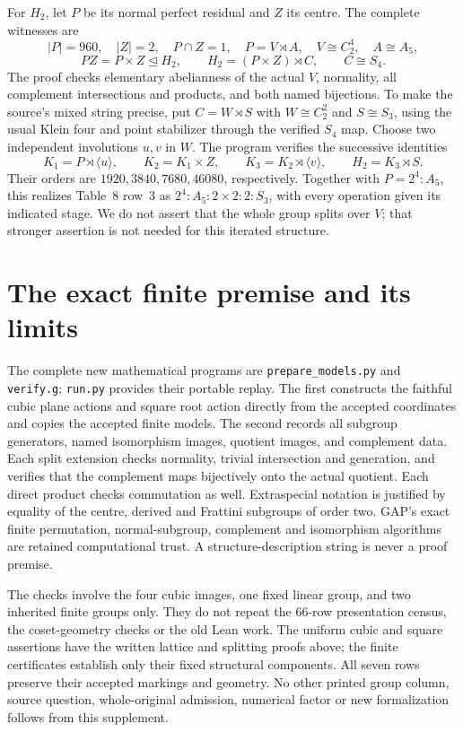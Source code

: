\documentclass[11pt]{article}
\newcommand{\C}{C}\newcommand{\Z}{\mathbb Z}
\begin{document}
For $H_2$, let $P$ be its normal perfect residual and $Z$ its centre.
The complete witnesses are
\[
 |P|=960,\quad |Z|=2,\quad P\cap Z=1,\quad
 P=V\rtimes A,\quad V\cong\C_2^4,\quad A\cong A_5,
\]
\[
 PZ=P\times Z\trianglelefteq H_2,\qquad
 H_2=(P\times Z)\rtimes C,\qquad C\cong S_4.
\]
The proof checks elementary abelianness of the actual $V$, normality,
all complement intersections and products, and both named bijections.
To make the source's mixed string precise, put
$C=W\rtimes S$ with $W\cong\C_2^2$ and $S\cong S_3$, using the usual
Klein four and point stabilizer through the verified $S_4$ map. Choose
two independent involutions $u,v$ in $W$. The program verifies the
successive identities
\[
 K_1=P\rtimes\langle u\rangle,\qquad
 K_2=K_1\times Z,\qquad K_3=K_2\rtimes\langle v\rangle,
 \qquad H_2=K_3\rtimes S.
\]
Their orders are $1920,3840,7680,46080$, respectively. Together with
$P=2^4:A_5$, this realizes Table~8 row~3 as
$2^4:A_5:2\times2:2:S_3$, with every operation given its indicated
stage. We do not assert that the whole group splits over $V$; that
stronger assertion is not needed for this iterated structure.

\section{The exact finite premise and its limits}
The complete new mathematical programs are
\texttt{prepare\_models.py} and \texttt{verify.g}; \texttt{run.py}
provides their portable replay. The first constructs the faithful cubic
plane actions and square root action directly from the accepted
coordinates and copies the accepted finite models. The second records
all subgroup generators, named isomorphism images, quotient images,
and complement data. Each split extension checks normality, trivial
intersection and generation, and verifies that the complement maps
bijectively onto the actual quotient. Each direct product checks
commutation as well. Extraspecial notation is justified by equality of
the centre, derived and Frattini subgroups of order two. GAP's exact
finite permutation, normal-subgroup, complement and isomorphism
algorithms are retained computational trust. A structure-description
string is never a proof premise.

The checks involve the four cubic images, one fixed linear group, and
two inherited finite groups only. They do not repeat the 66-row
presentation census, the coset-geometry checks or the old Lean work.
The uniform cubic and square assertions have the written lattice and
splitting proofs above; the finite certificates establish only their
fixed structural components. All seven rows preserve their accepted
markings and geometry. No other printed group column, source question,
whole-original admission, numerical factor or new formalization follows
from this supplement.
\end{document}
